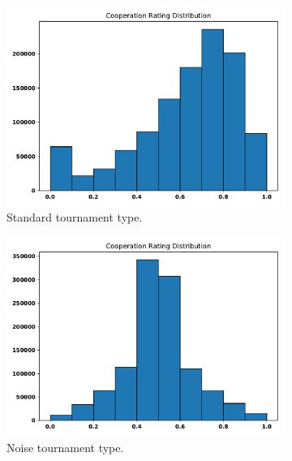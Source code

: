 \documentclass{article}
\begin{document}
\begin{figure}
    \centering
    \begin{subfigure}{0.45\textwidth}
        \includegraphics[width=\textwidth]{images/cooperation_distribution_std}
        \caption{Standard tournament type.}
    \end{subfigure}
    \begin{subfigure}{0.45\textwidth}
        \includegraphics[width=\textwidth]{images/cooperation_distribution_noise}
        \caption{Noise tournament type.}
    \end{subfigure}
    \begin{subfigure}{0.45\textwidth}

\end{subfigure}
\end{figure}
\end{document}
